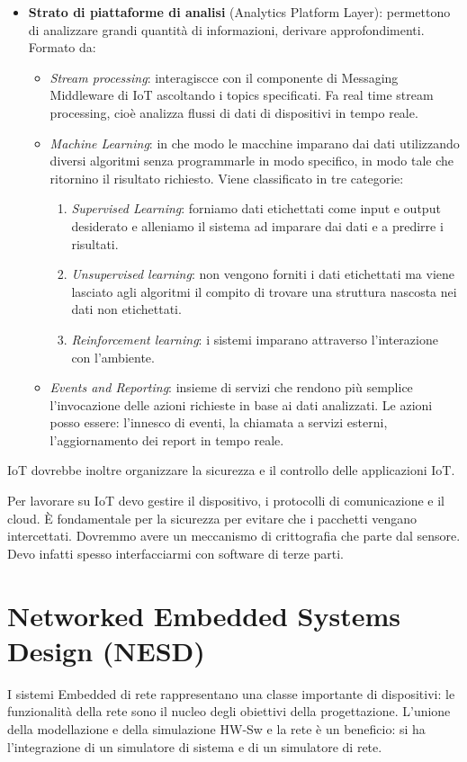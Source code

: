 \documentclass[a4paper]{article}
\theoremstyle{definition}
\begin{document}
\begin{itemize}
\begin{itemize}
				\end{itemize}
				\item \textbf{Strato di piattaforme di analisi} (Analytics Platform Layer): permettono di analizzare grandi quantità di informazioni, derivare approfondimenti. Formato da:
				\begin{itemize}
					\item \textit{Stream processing}: interagiscce con il componente di Messaging Middleware di IoT ascoltando i topics specificati. Fa real time stream processing, cioè analizza flussi di dati di dispositivi in tempo reale. 
					\item \textit{Machine Learning}: in che modo le macchine imparano dai dati utilizzando diversi algoritmi senza programmarle in modo specifico, in modo tale che ritornino il risultato richiesto. Viene classificato in tre categorie:
					\begin{enumerate}
						\item \textit{Supervised Learning}: forniamo dati etichettati come input e output desiderato e alleniamo il sistema ad imparare dai dati e a predirre i risultati.
						\item \textit{Unsupervised learning}: non vengono forniti i dati etichettati ma viene lasciato agli algoritmi il compito di trovare una struttura nascosta nei dati non etichettati.
						\item \textit{Reinforcement learning}: i sistemi imparano attraverso l'interazione con l'ambiente.
					\end{enumerate}
					\item \textit{Events and Reporting}: insieme di servizi che rendono più semplice l'invocazione delle azioni richieste in base ai dati analizzati. Le azioni posso essere: l'innesco di eventi, la chiamata a servizi esterni, l'aggiornamento dei report in tempo reale.
				\end{itemize}
			\end{itemize}
			IoT dovrebbe inoltre organizzare la sicurezza e il controllo delle applicazioni IoT.
		
		Per lavorare su IoT devo gestire il dispositivo, i protocolli di comunicazione e il cloud. È fondamentale per la sicurezza per evitare che i pacchetti vengano intercettati. Dovremmo avere un meccanismo di crittografia che parte dal sensore. Devo infatti spesso interfacciarmi con software di terze parti.
	
 	\section{Networked Embedded Systems Design (NESD)}
	 	I sistemi Embedded di rete rappresentano una classe importante di dispositivi: le funzionalità della rete sono il nucleo degli obiettivi della progettazione. L'unione della modellazione e della simulazione HW-Sw e la rete è un beneficio: si ha l'integrazione di un simulatore di sistema e di un simulatore di rete.
	 	
\end{document}
